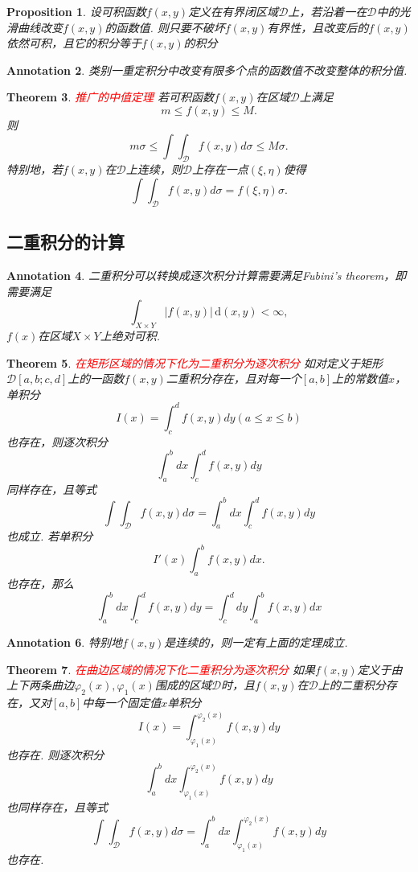 \documentclass{article}
\newtheorem{theorem}{Theorem}[section]
\newtheorem{proposition}[theorem]{Proposition}
\newtheorem{annotation}[theorem]{Annotation}
\newcommand{\redt}[1]{\textcolor{red}{#1}}
\begin{document}
\begin{proposition}
\rm 设可积函数$f(x,y)$定义在有界闭区域$\mathcal{D}$上，若沿着一在$\mathcal{D}$中的光滑曲线改变$f(x,y)$的函数值. 则只要不破坏$f(x,y)$有界性，且改变后的$f(x,y)$依然可积，且它的积分等于$f(x,y)$的积分
\end{proposition}

\begin{annotation}
\rm 类别一重定积分中改变有限多个点的函数值不改变整体的积分值.
\end{annotation}

\begin{theorem}
\rm \redt{推广的中值定理} 若可积函数$f(x,y)$在区域$\mathcal{D}$上满足
$$
m \leq f(x,y) \leq M.
$$
则
$$
m\sigma \leq \int\int_{\mathcal{D}}f(x,y)d\sigma \leq M\sigma.
$$
特别地，若$f(x,y)$在$\mathcal{D}$上连续，则$\mathcal{D}$上存在一点$(\xi,\eta)$使得
$$
\int\int_{\mathcal{D}}f(x,y)d\sigma = f(\xi,\eta)\sigma.
$$
\end{theorem}

\subsection{二重积分的计算}

\begin{annotation}
\rm 二重积分可以转换成逐次积分计算需要满足Fubini's theorem，即需要满足
$$
\int_{X\times Y} |f(x,y)|\,\text{d}(x,y)<\infty,
$$
$f(x)$在区域$X \times Y$上绝对可积. 
\end{annotation}

\begin{theorem}
\rm \redt{在矩形区域的情况下化为二重积分为逐次积分} 如对定义于矩形$\mathcal{D}[a,b;c,d]$上的一函数$f(x,y)$二重积分存在，且对每一个$[a,b]$上的常数值$x$，单积分
$$
I(x) = \int_c^d f(x,y)dy (a \leq x \leq b)
$$
也存在，则逐次积分
$$
\int_a^b dx \int_c^d f(x,y)dy
$$
同样存在，且等式
$$
\int\int_{\mathcal{D}}f(x,y)d\sigma = \int_a^b dx \int_c^d f(x,y)dy
$$
也成立. 若单积分
$$
I'(x)\int_a^b f(x,y)dx.
$$
也存在，那么
$$
\int_a^b dx \int_c^d f(x,y)dy = \int_c^d dy \int_a^b f(x,y)dx
$$
\end{theorem}

\begin{annotation}
\rm 特别地$f(x,y)$是连续的，则一定有上面的定理成立.
\end{annotation}

\begin{theorem}
\rm \redt{在曲边区域的情况下化二重积分为逐次积分} 如果$f(x,y)$定义于由上下两条曲边$\varphi_2(x),\varphi_1(x)$围成的区域$\mathcal{D}$时，且$f(x,y)$在$\mathcal{D}$上的二重积分存在，又对$[a,b]$中每一个固定值$x$单积分
$$
I(x) = \int_{\varphi_1(x)}^{\varphi_2(x)} f(x,y)dy
$$ 
也存在. 则逐次积分
$$
\int_a^b dx \int_{\varphi_1(x)}^{\varphi_2(x)} f(x,y)dy
$$
也同样存在，且等式
$$
\int\int_{\mathcal{D}}f(x,y)d\sigma = \int_a^b dx \int_{\varphi_1(x)}^{\varphi_2(x)} f(x,y)dy
$$
也存在. 
\end{theorem}
\end{document}
